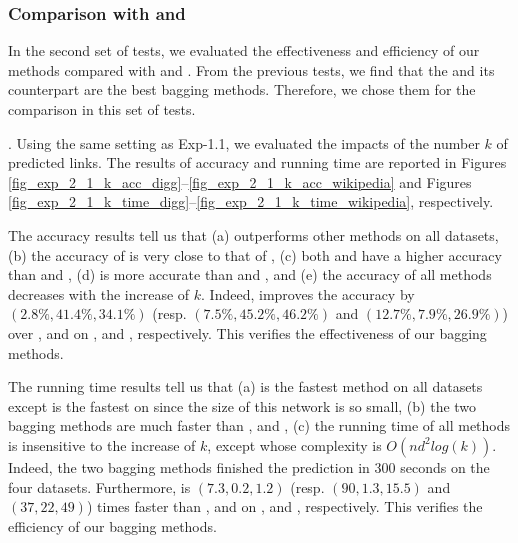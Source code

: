 \subsubsection{Comparison with \Aa and \BIGCLAM}
In the second set of tests, we evaluated the effectiveness and efficiency of our
methods compared with \Aa and \BIGCLAM. From the previous tests, we find that the
\Biasedp and its counterpart \Biased are the best bagging methods. Therefore, we
chose them for the comparison in this set of tests.


. Using the same setting as Exp-1.1, we evaluated
the impacts of the number $k$ of predicted links.
The results of accuracy and running time are reported in Figures \ref{fig_exp_2_1_k_acc_digg}--\ref{fig_exp_2_1_k_acc_wikipedia}
and Figures \ref{fig_exp_2_1_k_time_digg}--\ref{fig_exp_2_1_k_time_wikipedia}, respectively.


The accuracy results tell us that (a) \Biased outperforms other methods on all datasets,
(b) the accuracy of \Biasedp is very close to that of \Biased, (c) both
\Biased and \Biasedp have a higher accuracy than \Aa and \BIGCLAM, (d) \NMF is more accurate
than \Aa and \BIGCLAM, and (e) the accuracy of all methods decreases with the increase of $k$.
Indeed, \Biased improves the accuracy by $(2.8\%, 41.4\%, 34.1\%)$ (resp. $(7.5\%, 45.2\%, 46.2\%)$
and $(12.7\%, 7.9\%, 26.9\%)$) over \NMF, \Aa and \BIGCLAM on \Digg, \YouTube and \Wikipedia,
respectively. This verifies the effectiveness of our bagging methods.


The running time results tell us that (a) \Biasedp is the fastest method on all
datasets except \Aa is the fastest on \Digg since the size of this network is so
small, (b) the two bagging methods are much faster than \NMF, \Aa and \BIGCLAM,
(c) the running time of all methods is insensitive to the increase of $k$,
except \Aa whose complexity is $O(nd^2log(k))$.
Indeed, the two bagging methods finished the prediction in 300 seconds on the four datasets.
Furthermore, \Biasedp is $(7.3, 0.2, 1.2)$ (resp. $(90, 1.3, 15.5)$ and $(37, 22, 49)$)
times faster than \NMF, \Aa and \BIGCLAM on
\Digg, \YouTube and \Wikipedia, respectively.
This verifies the efficiency of our bagging methods.


